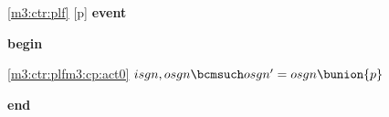 \noindent \ref{m3:ctr:plf} [p] \textbf{event}
\begin{block}
  \item   \textbf{begin}
  \begin{block}
  \item[ \eqref{m3:ctr:plfm3:cp:act0} ]$isgn,osgn \bcmsuch osgn' = osgn \bunion \{ p \} $ %
  \end{block}
  \item   \textbf{end} \\
\end{block}
